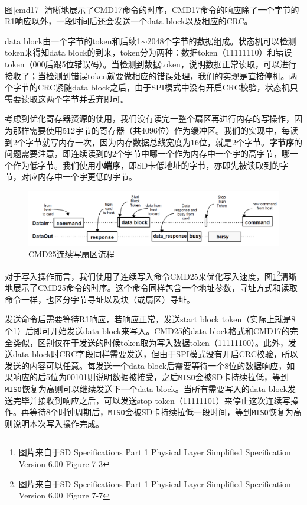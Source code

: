 \documentclass[11pt,utf8]{report}
\begin{document}
	\par 图\ref{cmd17}\footnote{图片来自于SD Specifications Part 1 Physical Layer Simplified Specification Version 6.00 Figure 7-3}清晰地展示了CMD17命令的时序，CMD17命令的响应除了一个字节的R1响应以外，一段时间后还会发送一个data block以及相应的CRC。
	
	\par data block由一个字节的token和后续1$\sim$2048个字节的数据组成。状态机可以检测token来得知data block的到来，token分为两种：数据token（11111110）和错误token（000后跟5位错误码）。当检测到数据token，说明数据正常读取，可以进行接收了；当检测到错误token就要做相应的错误处理，我们的实现是直接停机。两个字节的CRC紧随data block之后，由于SPI模式中没有开启CRC校验，状态机只需要读取这两个字节并丢弃即可。
	
	\par 考虑到优化寄存器资源的使用，我们没有读完一整个扇区再进行内存的写操作，因为那样需要使用512字节的寄存器（共4096位）作为缓冲区。我们的实现中，每读到2个字节就写内存一次，因为内存数据总线宽度为16位，就是2个字节。\textbf{字节序}的问题需要注意，即连续读到的2个字节中哪一个作为内存中一个字的高字节，哪一个作为低字节。我们使用\textbf{小端序}，即SD卡低地址的字节，亦即先被读取到的字节，对应内存中一个字更低的字节。
	
	\begin{figure}[h!]
		\centering
		\includegraphics[width=\textwidth]{cmd25}
		\caption{CMD25连续写扇区流程}
		\label{cmd25}
	\end{figure}
	
	\par 对于写入操作而言，我们使用了连续写入命令CMD25来优化写入速度，图\ref{cmd25}\footnote{图片来自于SD Specifications Part 1 Physical Layer Simplified Specification Version 6.00 Figure 7-7}清晰地展示了CMD25命令的时序。这个命令同样包含一个地址参数，寻址方式和读取命令一样，也区分字节寻址以及块（或扇区）寻址。
	
	\par 发送命令后需要等待R1响应，若响应正常，发送start block token（实际上就是8个1）后即可开始发送data block来写入。CMD25的data block格式和CMD17的完全类似，区别仅在于发送的时候token取为写入数据token（11111100）。此外，发送data block时CRC字段同样需要发送，但由于SPI模式没有开启CRC校验，所以发送的内容可以任意。每发送一个data block后需要等待一个8位的数据响应，如果响应的后5位为00101则说明数据被接受，之后\texttt{MISO}会被SD卡持续拉低，等到\texttt{MISO}恢复为高则可以继续发送下一个data block。当所有需要写入的data block发送完毕并接收到响应之后，可以发送stop token（11111101）来停止这次连续写操作。再等待8个时钟周期后，\texttt{MISO}会被SD卡持续拉低一段时间，等到\texttt{MISO}恢复为高则说明本次写入操作完成。
	
\end{document}
